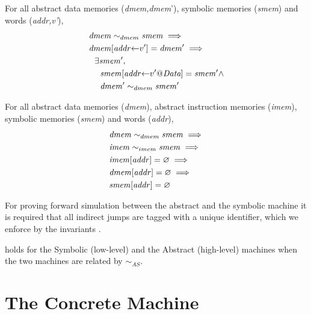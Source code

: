 \begin{lemma}
\label{refine_memory_upd_fwd}
For all abstract data memories (\textit{dmem,dmem}'),
symbolic memories (\textit{smem}) and
words (\textit{addr,v'}),
\begin{align*}
  & \mathit{dmem} \sim_{dmem} \mathit{smem} \implies \\
  & \mathit{dmem}[\mathit{addr}{\leftarrow}v'] = \mathit{dmem'} \implies \\
  & ~~ \exists \mathit{smem'}, \\
  & ~~~~ \mathit{smem}[\mathit{addr}{\leftarrow}v'@\textit{Data}] = \mathit{smem'} \land \\
  & ~~~~  \mathit{dmem'} \sim_{dmem} \mathit{smem'}
\end{align*}
\end{lemma}

\begin{lemma}
\label{refine_memory_none}
For all abstract data memories (\textit{dmem}),
abstract instruction memories (\textit{imem}),
symbolic memories (\textit{smem}) and words (\textit{addr}),
\begin{align*}
  & \mathit{dmem} \sim_{dmem} \mathit{smem} \implies \\
  & \mathit{imem} \sim_{imem} \mathit{smem} \implies \\
  & \mathit{imem}[\mathit{addr}] = \varnothing\implies \\
  & \mathit{dmem}[\mathit{addr}] = \varnothing\implies \\
  & \mathit{smem}[\mathit{addr}] = \varnothing
\end{align*}
\end{lemma}

For proving forward simulation between the abstract and the symbolic
machine it is required that all indirect jumps are tagged with a
unique identifier, which we enforce by the invariants
.

\begin{theorem}
\label{fwd_simulation_SA}
 holds for the Symbolic (low-level) and
the Abstract (high-level) machines when the two machines are related
by $\sim_{AS}$.
\end{theorem}

\section{The Concrete  Machine}\label{sec:concrete_cfi}

